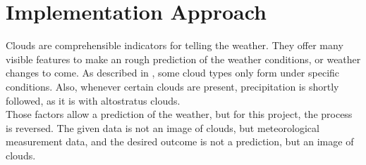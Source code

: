 \section{Implementation Approach}
Clouds are comprehensible indicators for telling the weather. 
They offer many visible features to make an rough prediction of the weather conditions, or weather changes to come.
As described in , some cloud types only form under specific conditions.
Also, whenever certain clouds are present, \gls{precipitation} is shortly followed, as it is with altostratus clouds.
\\
Those factors allow a prediction of the weather, but for this project, the process is reversed.
The given data is not an image of clouds, but meteorological measurement data, and the desired outcome is not a prediction, but an image of clouds.

